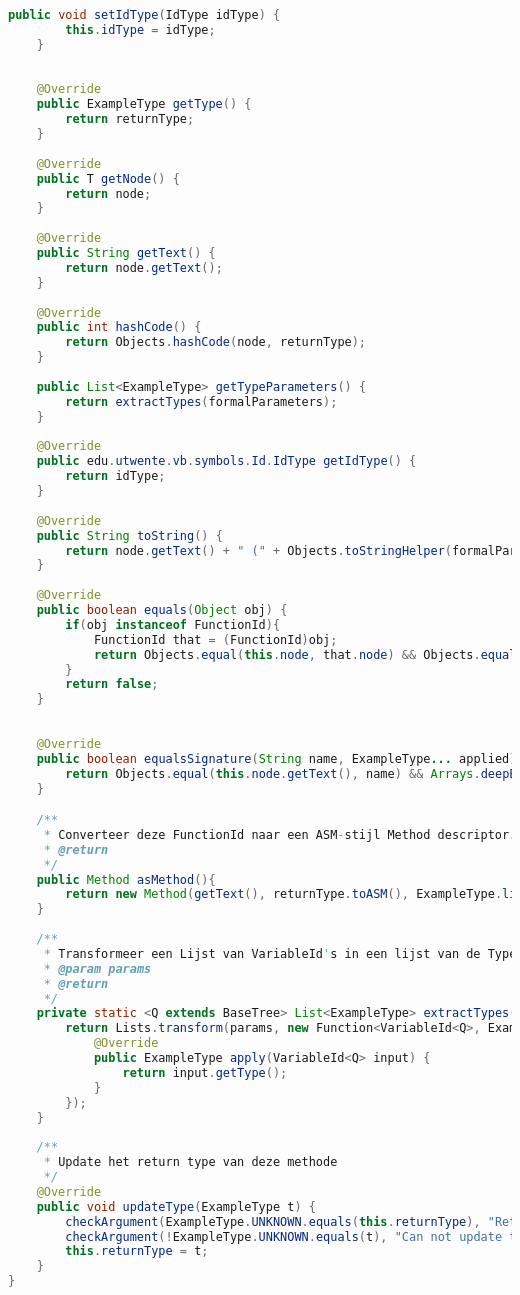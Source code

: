 \begin{lstlisting}[language=Java]
	public void setIdType(IdType idType) {
		this.idType = idType;
	}
	
	
	@Override
	public ExampleType getType() {
		return returnType;
	}
	
	@Override
	public T getNode() {
		return node;
	}
	
	@Override
	public String getText() {
		return node.getText();
	}
	
	@Override
	public int hashCode() {
		return Objects.hashCode(node, returnType);
	}
	
	public List<ExampleType> getTypeParameters() {
		return extractTypes(formalParameters);
	}
	
	@Override
	public edu.utwente.vb.symbols.Id.IdType getIdType() {
		return idType;
	}
	
	@Override
	public String toString() {
		return node.getText() + " (" + Objects.toStringHelper(formalParameters) + ") -> " + returnType;
	}
	
	@Override
	public boolean equals(Object obj) {
		if(obj instanceof FunctionId){
			FunctionId that = (FunctionId)obj;
			return Objects.equal(this.node, that.node) && Objects.equal(this.returnType, that.returnType) && Objects.equal(this.formalParameters, that.formalParameters);
		}
		return false;
	}
	
	
	@Override
	public boolean equalsSignature(String name, ExampleType... applied) {
		return Objects.equal(this.node.getText(), name) && Arrays.deepEquals(applied, ExampleType.asArray(extractTypes(formalParameters)));
	}

	/**
	 * Converteer deze FunctionId naar een ASM-stijl Method descriptor.
	 * @return
	 */
	public Method asMethod(){
		return new Method(getText(), returnType.toASM(), ExampleType.listToASM(extractTypes(formalParameters)));
	}
	
	/**
	 * Transformeer een Lijst van VariableId's in een lijst van de Type's die in de VariableId's zitten
	 * @param params 
	 * @return
	 */
	private static <Q extends BaseTree> List<ExampleType> extractTypes(List<VariableId<Q>> params){
		return Lists.transform(params, new Function<VariableId<Q>, ExampleType>() {
			@Override
			public ExampleType apply(VariableId<Q> input) {
				return input.getType();
			}
		});
	}
	
	/**
	 * Update het return type van deze methode 
	 */
	@Override
	public void updateType(ExampleType t) {
		checkArgument(ExampleType.UNKNOWN.equals(this.returnType), "Return type is not unknown");
		checkArgument(!ExampleType.UNKNOWN.equals(t), "Can not update to type UNKNOWN");
		this.returnType = t;
	}
}

\end{lstlisting}
